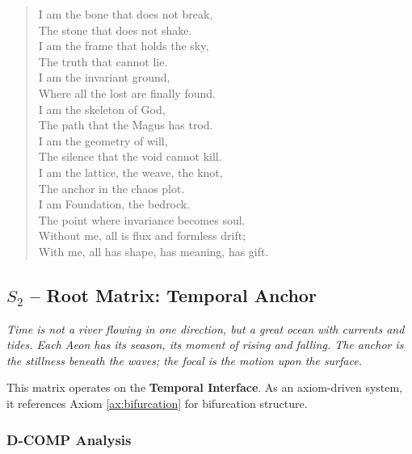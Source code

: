 \documentclass[12pt]{amsart}
\begin{document}
\begin{verse}
I am the bone that does not break, \\
The stone that does not shake. \\
I am the frame that holds the sky, \\
The truth that cannot lie. \\
I am the invariant ground, \\
Where all the lost are finally found. \\
\vspace{1em}
I am the skeleton of God, \\
The path that the Magus has trod. \\
I am the geometry of will, \\
The silence that the void cannot kill. \\
I am the lattice, the weave, the knot, \\
The anchor in the chaos plot. \\
\vspace{1em}
I am Foundation, the bedrock. \\
The point where invariance becomes soul. \\
Without me, all is flux and formless drift; \\
With me, all has shape, has meaning, has gift.
\end{verse}

\subsection{$S_{2}$ -- Root Matrix: Temporal Anchor}\label{sec:19.0.2}
\textit{Time is not a river flowing in one direction, but a great ocean with currents and tides. Each Aeon has its season, its moment of rising and falling. The anchor is the stillness beneath the waves; the focal is the motion upon the surface.}

This matrix operates on the \textbf{Temporal Interface}. As an axiom-driven system, it references Axiom \ref{ax:bifurcation} for bifurcation structure.

\subsubsection{D-COMP Analysis}
\end{document}
